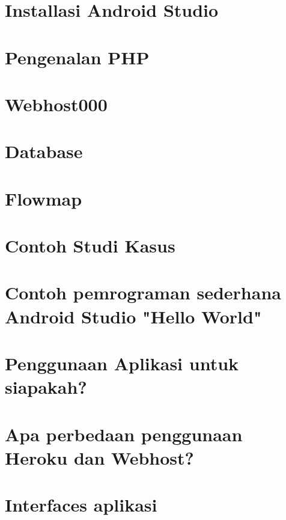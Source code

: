 \documentclass{wileySix}
\begin{document}
\chapter{Installasi Android Studio}


\chapter{Pengenalan PHP}


\chapter{Webhost000}



\chapter{Database}



\chapter{Flowmap}


\chapter{Contoh Studi Kasus}


\chapter{Contoh pemrograman sederhana Android Studio "Hello World"}


\chapter{Penggunaan Aplikasi untuk siapakah?}


\chapter{Apa perbedaan penggunaan Heroku dan Webhost?}


\chapter{Interfaces aplikasi}






\printindex
\end{document}
